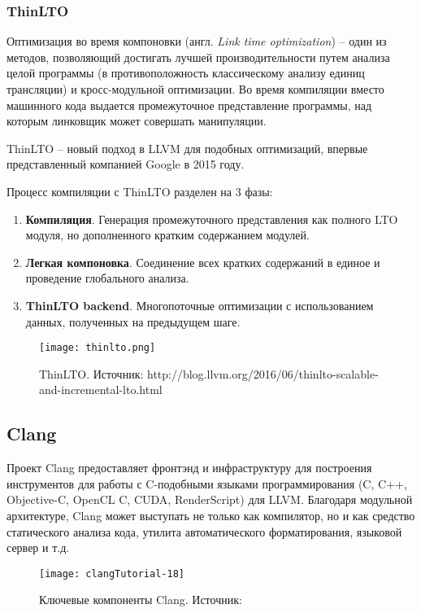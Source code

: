 \subsubsection{ThinLTO}
Оптимизация во время компоновки (англ. \textit{Link time optimization}) -- один
из методов, позволяющий достигать лучшей производительности путем анализа целой
программы (в противоположность классическому анализу единиц трансляции) и
кросс-модульной оптимизации. Во время компиляции вместо машинного кода выдается
промежуточное представление программы, над которым линковщик может совершать
манипуляции.

ThinLTO -- новый подход в LLVM для подобных оптимизаций, впервые представленный
компанией Google в 2015 году\cite{Johnson}.

Процесс компиляции с ThinLTO разделен на 3 фазы:
\begin{enumerate}
  \item \textbf{Компиляция}. Генерация промежуточного представления как полного
        LTO модуля, но дополненного кратким содержанием модулей.
  \item \textbf{Легкая компоновка}. Соединение всех кратких содержаний в единое
        и проведение глобального анализа.
  \item \textbf{ThinLTO backend}. Многопоточные оптимизации с использованием
        данных, полученных на предыдущем шаге.
\end{enumerate}
\begin{figure}[h]
  \centering
  \texttt{[image: thinlto.png]}
  \caption{ThinLTO. Источник: http://blog.llvm.org/2016/06/thinlto-scalable-and-incremental-lto.html}
\end{figure}

\subsection{Clang}
Проект Clang предоставляет фронтэнд и инфраструктуру для построения инструментов
для работы с C-подобными языками программирования (C, C++, Objective-C,
OpenCL C, CUDA, RenderScript) для LLVM. Благодаря модульной архитектуре, Clang
может выступать не только как компилятор, но и как средство статического анализа
кода, утилита автоматического форматирования, языковой сервер и т.д.

\begin{figure}[h]
  \centering
  \texttt{[image: clangTutorial-18]}
  \caption{Ключевые компоненты Clang. Источник: \cite{VanHaagstretSvenARMandStulova2019}}
  \label{fig:clang_core}
\end{figure}
